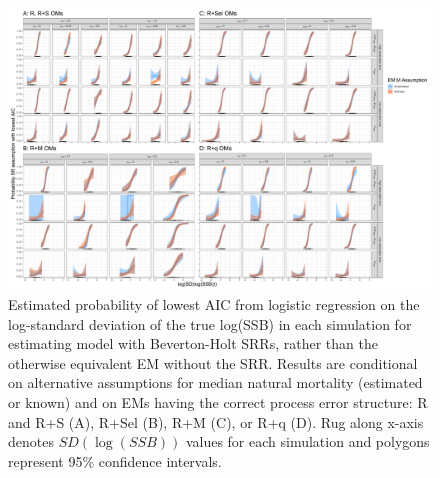 \documentclass[
  12pt,
]{article}
\begin{document}
\begin{landscape}
\begin{figure}
\begin{center}
\includegraphics[width = 1.4\textwidth]{sr_aic_plots}
\end{center}
\caption{Estimated probability of lowest AIC from logistic regression on the log-standard deviation of the true log(SSB) in each simulation for estimating model with Beverton-Holt SRRs, rather than the otherwise equivalent EM without the SRR. Results are conditional on alternative assumptions for median natural mortality (estimated or known) and on EMs having the correct process error structure: R and R+S (A), R+Sel (B), R+M (C), or R+q (D). Rug along x-axis denotes $SD(\log(SSB))$ values for each simulation and polygons represent 95\% confidence intervals.}\label{sr_aic_supp}
\end{figure}
\end{landscape}
\end{document}
